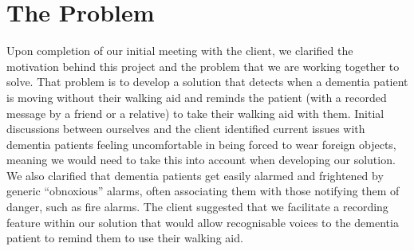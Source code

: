     \section{The Problem}
        Upon completion of our initial meeting with the client, we clarified the motivation behind this project and the
        problem that we are working together to solve. That problem is to develop a solution that detects when a
        dementia patient is moving without their walking aid and reminds the patient (with a recorded message by a
        friend or a relative) to take their walking aid with them. Initial discussions between ourselves and the client
        identified current issues with dementia patients feeling uncomfortable in being forced to wear foreign objects,
        meaning we would need to take this into account when developing our solution. We also clarified that dementia
        patients get easily alarmed and frightened by generic “obnoxious” alarms, often associating them with those
        notifying them of danger, such as fire alarms. The client suggested that we facilitate a recording feature
        within our solution that would allow recognisable voices to the dementia patient to remind them to use their
        walking aid.

